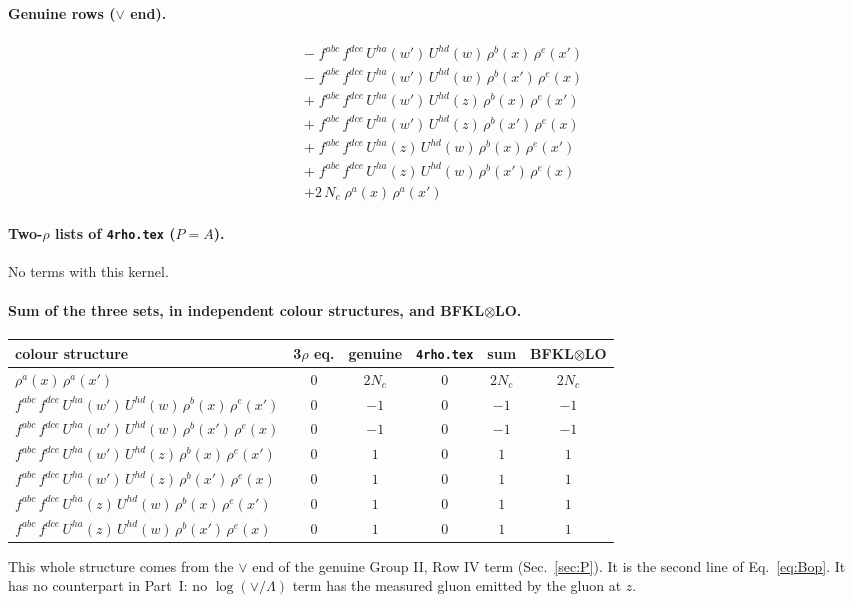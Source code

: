 \documentclass[10pt]{article}
\numberwithin{equation}{section}
\begin{document}
\paragraph{Genuine rows ($\vee$ end).}
\begin{align*}
&-\;f^{abc}\,f^{dce}\,U^{ha}(w')\,U^{hd}(w)\,\rho^{b}(x)\,\rho^{e}(x')\\&-\;f^{abc}\,f^{dce}\,U^{ha}(w')\,U^{hd}(w)\,\rho^{b}(x')\,\rho^{e}(x)\\&+\;f^{abc}\,f^{dce}\,U^{ha}(w')\,U^{hd}(z)\,\rho^{b}(x)\,\rho^{e}(x')\\&+\;f^{abc}\,f^{dce}\,U^{ha}(w')\,U^{hd}(z)\,\rho^{b}(x')\,\rho^{e}(x)\\&+\;f^{abc}\,f^{dce}\,U^{ha}(z)\,U^{hd}(w)\,\rho^{b}(x)\,\rho^{e}(x')\\&+\;f^{abc}\,f^{dce}\,U^{ha}(z)\,U^{hd}(w)\,\rho^{b}(x')\,\rho^{e}(x)\\&+2\,N_c\;\rho^{a}(x)\,\rho^{a}(x')
\end{align*}
\paragraph{Two-$\rho$ lists of \texttt{4rho.tex} ($P=A$).}
No terms with this kernel.
\paragraph{Sum of the three sets, in independent colour structures, and BFKL$\otimes$LO.}
\begin{center}\small\begin{tabular}{@{}l c c c c c@{}}
colour structure & 3$\rho$ eq. & genuine & \texttt{4rho.tex} & sum & BFKL$\otimes$LO\\ \hline
$\rho^{a}(x)\,\rho^{a}(x')$ & $0$ & $2 N_c$ & $0$ & $2 N_c$ & $2 N_c$\\
$f^{abc}\,f^{dce}\,U^{ha}(w')\,U^{hd}(w)\,\rho^{b}(x)\,\rho^{e}(x')$ & $0$ & $-1$ & $0$ & $-1$ & $-1$\\
$f^{abc}\,f^{dce}\,U^{ha}(w')\,U^{hd}(w)\,\rho^{b}(x')\,\rho^{e}(x)$ & $0$ & $-1$ & $0$ & $-1$ & $-1$\\
$f^{abc}\,f^{dce}\,U^{ha}(w')\,U^{hd}(z)\,\rho^{b}(x)\,\rho^{e}(x')$ & $0$ & $1$ & $0$ & $1$ & $1$\\
$f^{abc}\,f^{dce}\,U^{ha}(w')\,U^{hd}(z)\,\rho^{b}(x')\,\rho^{e}(x)$ & $0$ & $1$ & $0$ & $1$ & $1$\\
$f^{abc}\,f^{dce}\,U^{ha}(z)\,U^{hd}(w)\,\rho^{b}(x)\,\rho^{e}(x')$ & $0$ & $1$ & $0$ & $1$ & $1$\\
$f^{abc}\,f^{dce}\,U^{ha}(z)\,U^{hd}(w)\,\rho^{b}(x')\,\rho^{e}(x)$ & $0$ & $1$ & $0$ & $1$ & $1$\\
\end{tabular}\end{center}
This whole structure comes from the $\vee$ end of the genuine Group II, Row IV term (Sec.~\ref{sec:P}). It is the second line of Eq.~\eqref{eq:Bop}. It has no counterpart in Part~I: no $\log(\vee/\Lambda)$ term has the measured gluon emitted by the gluon at $z$.
\end{document}
